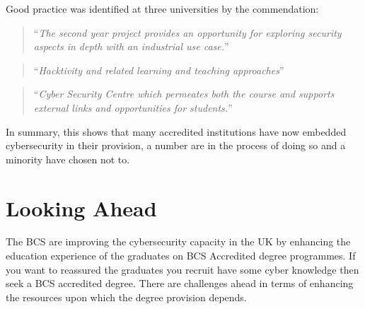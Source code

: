 \documentclass[a4paper,11pt]{article}
\begin{document}
Good practice was identified at three universities by the commendation:

 \begin{quote}
``{\emph{The second year project provides an opportunity for exploring security aspects in depth with an industrial use case.}}''
\end{quote}
\begin{quote}
``{\emph{Hacktivity and related learning and teaching approaches}}''
\end{quote}
\begin{quote}
``{\emph{Cyber Security Centre which permeates both the course and supports external links and opportunities for students.}}''
\end{quote}

In summary, this shows that many accredited institutions have now embedded cybersecurity in their provision, a number are in the process of doing so and a minority have chosen not to. 

\section*{Looking Ahead}

The BCS are improving the cybersecurity capacity in the UK by enhancing the education experience of the graduates on BCS Accredited degree programmes. If you want to reassured the graduates you recruit have some cyber knowledge then seek a BCS accredited degree. There are challenges ahead in terms of enhancing the resources upon which the degree provision depends.





\end{document}
